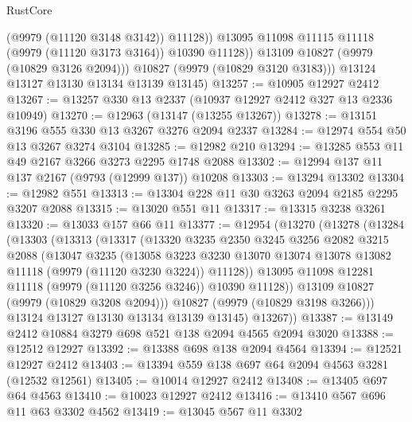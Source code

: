 \begin{lexlean}{RustCore}
\begin{coremodule}
                  (@9979 (@11120 @3148 @3142))
                  @11128))
              @13095
              @11098
              @11115
              @11118
              (@9979 (@11120 @3173 @3164))
              @10390
              @11128))
          @13109
          @10827
          (@9979 (@10829 @3126 @2094)))
        @10827
        (@9979 (@10829 @3120 @3183)))
      @13124
      @13127
      @13130
      @13134
      @13139
      @13145)
@13257 := @10905 @12927 @2412
@13267 := @13257 @330 @13 @2337 (@10937 @12927 @2412 @327 @13 @2336 @10949)
@13270 := @12963 (@13147 (@13255 @13267))
@13278 := @13151 @3196 @555 @330 @13 @3267 @3276 @2094 @2337
@13284 := @12974 @554 @50 @13 @3267 @3274 @3104
@13285 := @12982 @210
@13294 := @13285 @553 @11 @49 @2167 @3266 @3273 @2295 @1748 @2088
@13302 := @12994 @137 @11 @137 @2167 (@9793 (@12999 @137)) @10208
@13303 := @13294 @13302
@13304 := @12982 @551
@13313 := @13304 @228 @11 @30 @3263 @2094 @2185 @2295 @3207 @2088
@13315 := @13020 @551 @11
@13317 := @13315 @3238 @3261
@13320 := @13033 @157 @66 @11
@13377 := @12954
    (@13270
      (@13278
        (@13284
          (@13303
            (@13313
              (@13317
                (@13320
                  @3235
                  @2350
                  @3245
                  @3256
                  @2082
                  @3215
                  @2088
                  (@13047
                    @3235
                    (@13058
                      @3223
                      @3230
                      @13070
                      @13074
                      @13078
                      @13082
                      @11118
                      (@9979 (@11120 @3230 @3224))
                      @11128))
                  @13095
                  @11098
                  @12281
                  @11118
                  (@9979 (@11120 @3256 @3246))
                  @10390
                  @11128))
              @13109
              @10827
              (@9979 (@10829 @3208 @2094)))
            @10827
            (@9979 (@10829 @3198 @3266)))
          @13124
          @13127
          @13130
          @13134
          @13139
          @13145)
        @13267))
@13387 := @13149 @2412 @10884 @3279 @698 @521 @138 @2094 @4565 @2094 @3020
@13388 := @12512 @12927
@13392 := @13388 @698 @138 @2094 @4564
@13394 := @12521 @12927 @2412
@13403 := @13394 @559 @138 @697 @64 @2094 @4563 @3281 (@12532 @12561)
@13405 := @10014 @12927 @2412
@13408 := @13405 @697 @64 @4563
@13410 := @10023 @12927 @2412
@13416 := @13410 @567 @696 @11 @63 @3302 @4562
@13419 := @13045 @567 @11 @3302

\end{coremodule}
\end{lexlean}
